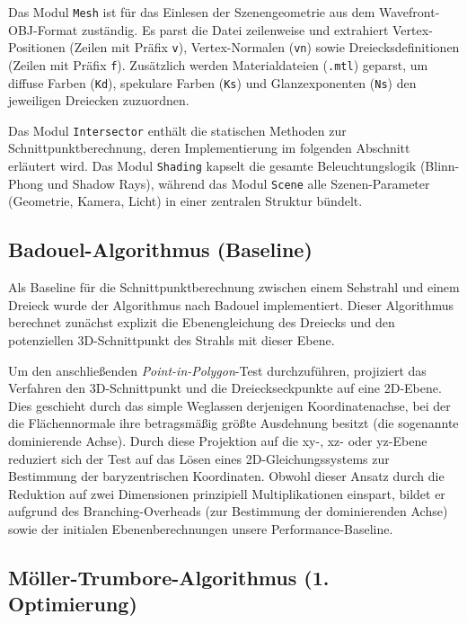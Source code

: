 \documentclass[11pt, a4paper]{article}
\begin{document}
Das Modul \texttt{Mesh} ist für das Einlesen der Szenengeometrie aus dem Wavefront-OBJ-Format zuständig. Es parst die Datei zeilenweise und extrahiert Vertex-Positionen (Zeilen mit Präfix \texttt{v}), Vertex-Normalen (\texttt{vn}) sowie Dreiecksdefinitionen (Zeilen mit Präfix \texttt{f}). Zusätzlich werden Materialdateien (\texttt{.mtl}) geparst, um diffuse Farben (\texttt{Kd}), spekulare Farben (\texttt{Ks}) und Glanzexponenten (\texttt{Ns}) den jeweiligen Dreiecken zuzuordnen.

Das Modul \texttt{Intersector} enthält die statischen Methoden zur Schnittpunktberechnung, deren Implementierung im folgenden Abschnitt erläutert wird. Das Modul \texttt{Shading} kapselt die gesamte Beleuchtungslogik (Blinn-Phong und Shadow Rays), während das Modul \texttt{Scene} alle Szenen-Parameter (Geometrie, Kamera, Licht) in einer zentralen Struktur bündelt.

\newpage
\subsection{Badouel-Algorithmus (Baseline)}

Als Baseline für die Schnittpunktberechnung zwischen einem Sehstrahl und einem Dreieck wurde der Algorithmus nach Badouel implementiert. Dieser Algorithmus berechnet zunächst explizit die Ebenengleichung des Dreiecks und den potenziellen 3D-Schnittpunkt des Strahls mit dieser Ebene. 

Um den anschließenden \textit{Point-in-Polygon}-Test durchzuführen, projiziert das Verfahren den 3D-Schnittpunkt und die Dreieckseckpunkte auf eine 2D-Ebene. Dies geschieht durch das simple Weglassen derjenigen Koordinatenachse, bei der die Flächennormale ihre betragsmäßig größte Ausdehnung besitzt (die sogenannte dominierende Achse). Durch diese Projektion auf die xy-, xz- oder yz-Ebene reduziert sich der Test auf das Lösen eines 2D-Gleichungssystems zur Bestimmung der baryzentrischen Koordinaten. Obwohl dieser Ansatz durch die Reduktion auf zwei Dimensionen prinzipiell Multiplikationen einspart, bildet er aufgrund des Branching-Overheads (zur Bestimmung der dominierenden Achse) sowie der initialen Ebenenberechnungen unsere Performance-Baseline.

\subsection{Möller-Trumbore-Algorithmus (1. Optimierung)}
\end{document}
